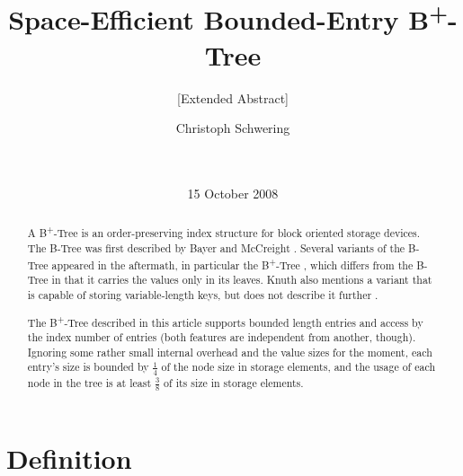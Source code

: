 \documentclass{vldb}
\begin{document}
\title{Space-Efficient Bounded-Entry B\textsuperscript{+}-Tree}
\subtitle{[Extended Abstract]}

\author{
\alignauthor
Christoph Schwering\\
   \\
   \\
}
\date{15 October 2008}


\maketitle

\begin{abstract}
A B\textsuperscript{+}-Tree is an order-preserving index structure for block
oriented storage devices.
The B-Tree was first described by Bayer and McCreight \cite{Bayer}.
Several variants of the B-Tree appeared in the aftermath, in particular the
B\textsuperscript{+}-Tree \cite{Cormen, KnuthBTree}, which differs from the
B-Tree in that it carries the values only in its leaves.
Knuth also mentions a variant that is capable of storing variable-length
keys, but does not describe it further \cite{KnuthBTree}.

The B\textsuperscript{+}-Tree described in this article supports bounded length
entries and access by the index number of entries (both features are independent
from another, though).
Ignoring some rather small internal overhead and the value sizes for the 
moment, each entry's size is bounded by $\tfrac{1}{4}$ of the node size
in storage elements, and the usage of each node in the tree is at least
$\tfrac{3}{8}$ of its size in storage elements.
\end{abstract}



\section{Definition} %
\end{document}
